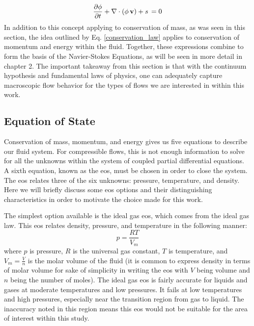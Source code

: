 \begin{equation} \label{conservation_law}
\dfrac{\partial \phi}{\partial t} +  \nabla \cdot \left(\phi \, \vb{v} \right) + s \,  = 0
\end{equation}
In addition to this concept applying to conservation of mass, as was seen in this section, the idea outlined by Eq. \ref{conservation_law} applies to conservation of momentum and energy within the fluid. Together, these expressions combine to form the basis of the Navier-Stokes Equations, as will be seen in more detail in chapter 2. The important takeaway from this section is that with the continuum hypothesis and fundamental laws of physics, one can adequately capture macroscopic flow behavior for the types of flows we are interested in within this work.  

\subsection{Equation of State}
Conservation of mass, momentum, and energy gives us five equations to describe our fluid system. For compressible flows, this is not enough information to solve for all the unknowns within the system of coupled partial differential equations. A sixth equation, known as the \gls{eos}, must be chosen in order to close the system. The \gls{eos} relates three of the six unknowns: pressure, temperature, and density. Here we will briefly discuss some \gls{eos} options and their distinguishing characteristics in order to motivate the choice made for this work. 

The simplest option available is the ideal gas \gls{eos}, which comes from the ideal gas law. This \gls{eos} relates density, pressure, and temperature in the following manner: 
\begin{equation} \label{ideal_gas}
p = \dfrac{RT}{V_m}
\end{equation}
where $p$ is pressure, $R$ is the universal gas constant, $T$ is temperature, and $V_m = \tfrac{V}{n}$ is the molar volume of the fluid (it is common to express density in terms of molar volume for sake of simplicity in writing the \gls{eos} with $V$ being volume and $n$ being the number of moles). The ideal gas \gls{eos} is fairly accurate for liquids and gases at moderate temperatures and low pressures. It fails at low temperatures and high pressures, especially near the transition region from gas to liquid. The inaccuracy noted in this region means this \gls{eos} would not be suitable for the area of interest within this study. 

